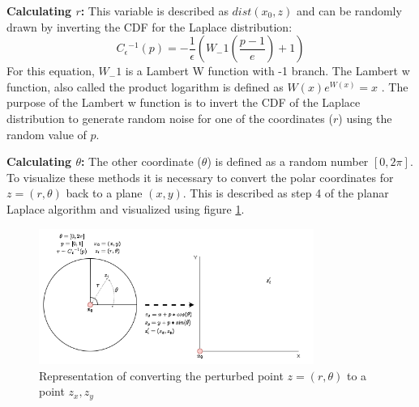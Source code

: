 \textbf{Calculating $r$:}
This variable is described as $dist(x_0, z)$ and can be randomly drawn by inverting the CDF for the Laplace distribution:
\begin{equation}
  C{_\epsilon}{^{-1}}(p) = - \frac{1}{\epsilon}(W_-1 (\frac{p - 1}{e}) + 1)
\end{equation}
For this equation, $W_-1$ is a Lambert W function with -1 branch.
The Lambert w function, also called the product logarithm is defined as $W(x)e^{W(x)} = x$ \citep{lehtonen_lambert_2016}.
The purpose of the Lambert w function is to invert the CDF of the Laplace distribution to generate random noise for one of the coordinates ($r$) using the random value of $p$.

\textbf{Calculating $\theta$:}
The other coordinate ($\theta$) is defined as a random number $[0, 2\pi]$. \newline
To visualize these methods it is necessary to convert the polar coordinates for $z = (r, \theta)$ back to a plane $(x, y)$.
This is described as step 4 of the planar Laplace algorithm \citep{DBLP:journals/corr/abs-1212-1984} and visualized using figure \ref{figure:geo}.
\begin{figure}[h]
  \includegraphics[width=0.8\textwidth]{TheorethicalFramework/ND-Laplace/Images/polar-laplace-to-planar.png}
  \centering
  \caption{Representation of converting the perturbed point $z = (r, \theta)$ to a point ${z_x, z_y}$}
  \label{figure:geo}
\end{figure}



\newpage

